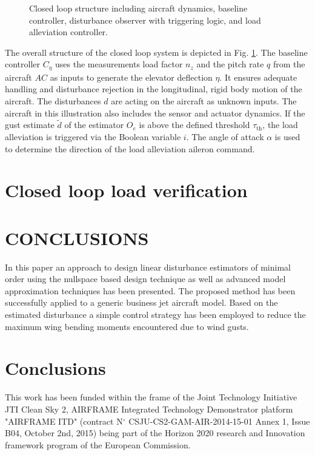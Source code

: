 \documentclass[graybox]{svmult}
\begin{document}
\begin{figure}[bth]
	\centering
	
	\caption{Closed loop structure including aircraft dynamics, baseline controller, disturbance observer with triggering logic, and  load alleviation controller. }
	\label{fig:cl}	
\end{figure}

The overall structure of the closed loop system is depicted in Fig. \ref{fig:cl}. The baseline controller $C_\eta$ uses the measurements load factor $n_z$ and the pitch rate $q$ from the aircraft $AC$ as inputs to generate the elevator deflection $\eta$. It ensures adequate handling and disturbance rejection in the longitudinal, rigid body motion of the aircraft. The disturbances $d$ are acting on the aircraft as unknown inputs. The aircraft in this illustration also includes the sensor and actuator dynamics.
If the gust estimate $\tilde d$ of the estimator $O_e$ is above the defined threshold $\tau_{\text{th}}$, the load alleviation is triggered via the Boolean variable $i$. The angle of attack $\alpha$ is used to determine the direction of the load alleviation aileron command.



\section{Closed loop load verification}\label{sec:res}


\section{CONCLUSIONS}
In this paper an approach to design linear disturbance estimators of minimal order using the nullspace based design technique as well as advanced model approximation techniques has been presented. The proposed method has been successfully applied to a generic business jet aircraft model. Based on the estimated disturbance a simple control strategy has been employed to reduce the maximum wing bending moments encountered due to wind gusts.








\section*{Conclusions}




\begin{acknowledgement}
This work has been funded within the frame of the Joint Technology
Initiative JTI Clean Sky 2, AIRFRAME Integrated Technology Demonstrator
platform "AIRFRAME ITD" (contract N$^\circ$ CSJU-CS2-GAM-AIR-2014-15-01 Annex
1, Issue B04, October 2nd, 2015) being part of the Horizon 2020 research
and Innovation framework program of the European Commission.
\end{acknowledgement}
%




%
\end{document}
